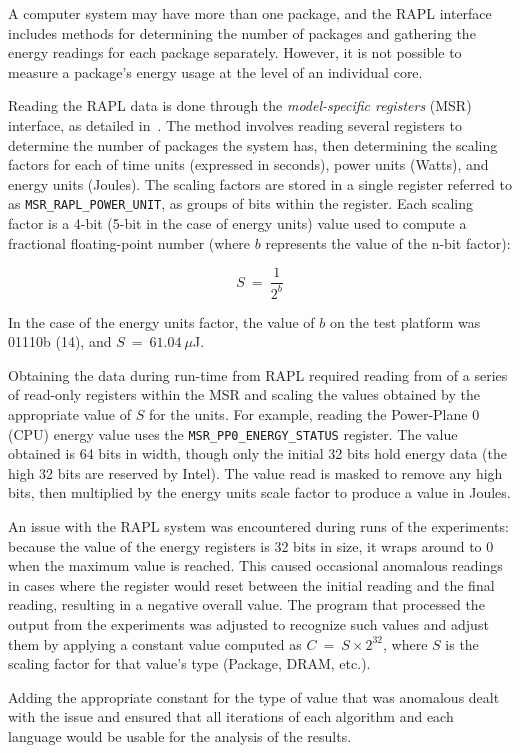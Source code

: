 A computer system may have more than one package, and the RAPL interface includes methods for determining the number of packages and gathering the energy readings for each package separately. However, it is not possible to measure a package's energy usage at the level of an individual core.

Reading the RAPL data is done through the \textit{model-specific registers} (MSR) interface, as detailed in~\cite[Chapter~14]{intel.sdm.2022}. The method involves reading several registers to determine the number of packages the system has, then determining the scaling factors for each of time units (expressed in seconds), power units (Watts), and energy units (Joules). The scaling factors are stored in a single register referred to as \texttt{MSR\_RAPL\_POWER\_UNIT}, as groups of bits within the register. Each scaling factor is a 4-bit (5-bit in the case of energy units) value used to compute a fractional floating-point number (where $b$ represents the value of the n-bit factor):

\[S~=~\frac{1}{2^{b}}\]

In the case of the energy units factor, the value of $b$ on the test platform was 01110b (14), and $S~=~61.04~\mu$J.

Obtaining the data during run-time from RAPL required reading from of a series of read-only registers within the MSR and scaling the values obtained by the appropriate value of $S$ for the units. For example, reading the Power-Plane 0 (CPU) energy value uses the \texttt{MSR\_PP0\_ENERGY\_STATUS} register. The value obtained is 64 bits in width, though only the initial 32 bits hold energy data (the high 32 bits are reserved by Intel). The value read is masked to remove any high bits, then multiplied by the energy units scale factor to produce a value in Joules.

An issue with the RAPL system was encountered during runs of the experiments: because the value of the energy registers is 32 bits in size, it wraps around to 0 when the maximum value is reached. This caused occasional anomalous readings in cases where the register would reset between the initial reading and the final reading, resulting in a negative overall value. The program that processed the output from the experiments was adjusted to recognize such values and adjust them by applying a constant value computed as $C~=~S \times 2^{32}$, where $S$ is the scaling factor for that value's type (Package, DRAM, etc.).

Adding the appropriate constant for the type of value that was anomalous dealt with the issue and ensured that all iterations of each algorithm and each language would be usable for the analysis of the results.


